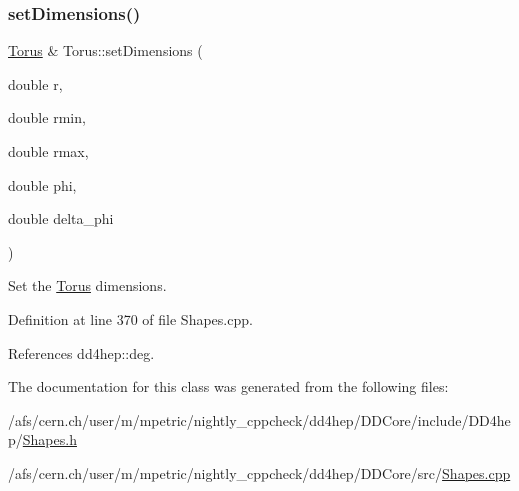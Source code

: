 \subsubsection{\texorpdfstring{set\+Dimensions()}{setDimensions()}}
{\footnotesize\ttfamily \hyperlink{class_d_d4hep_1_1_geometry_1_1_torus}{Torus} \& Torus\+::set\+Dimensions (\begin{DoxyParamCaption}\item[{double}]{r,  }\item[{double}]{rmin,  }\item[{double}]{rmax,  }\item[{double}]{phi,  }\item[{double}]{delta\+\_\+phi }\end{DoxyParamCaption})}



Set the \hyperlink{class_d_d4hep_1_1_geometry_1_1_torus}{Torus} dimensions. 



Definition at line 370 of file Shapes.\+cpp.



References dd4hep\+::deg.



The documentation for this class was generated from the following files\+:\begin{DoxyCompactItemize}
\item 
/afs/cern.\+ch/user/m/mpetric/nightly\+\_\+cppcheck/dd4hep/\+D\+D\+Core/include/\+D\+D4hep/\hyperlink{_shapes_8h}{Shapes.\+h}\item 
/afs/cern.\+ch/user/m/mpetric/nightly\+\_\+cppcheck/dd4hep/\+D\+D\+Core/src/\hyperlink{_shapes_8cpp}{Shapes.\+cpp}\end{DoxyCompactItemize}
